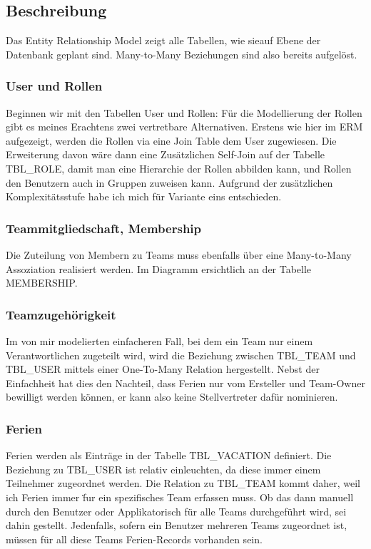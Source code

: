 \subsection{Beschreibung}
Das Entity Relationship Model zeigt alle Tabellen, wie sieauf Ebene der Datenbank geplant sind. Many-to-Many Beziehungen sind also bereits aufgel\"ost. 

\subsubsection{User und Rollen}
Beginnen wir mit den Tabellen User und Rollen: F\"ur die Modellierung der Rollen gibt es meines Erachtens zwei vertretbare Alternativen. Erstens wie hier im ERM aufgezeigt, werden die Rollen via eine Join Table dem User zugewiesen. Die Erweiterung davon w\"are dann eine Zus\"atzlichen Self-Join auf der Tabelle TBL\_ROLE, damit man eine Hierarchie der Rollen abbilden kann, und Rollen den Benutzern auch in Gruppen zuweisen kann. Aufgrund der zus\"atzlichen Komplexit\"atsstufe habe ich mich f\"ur Variante eins entschieden.

\subsubsection{Teammitgliedschaft, Membership}
Die Zuteilung von Membern zu Teams muss ebenfalls \"uber eine Many-to-Many Assoziation realisiert werden. Im Diagramm ersichtlich an der Tabelle MEMBERSHIP. 

\subsubsection{Teamzugeh\"origkeit}
Im von mir modelierten einfacheren Fall, bei dem ein Team nur einem Verantwortlichen zugeteilt wird, wird die Beziehung zwischen TBL\_TEAM und TBL\_USER mittels einer One-To-Many Relation hergestellt. Nebst der Einfachheit hat dies den Nachteil, dass Ferien nur vom Ersteller und Team-Owner bewilligt werden k\"onnen, er kann also keine Stellvertreter daf\"ur nominieren. 

\subsubsection{Ferien}
Ferien werden als Eintr\"age in der Tabelle TBL\_VACATION definiert. Die Beziehung zu TBL\_USER ist relativ einleuchten, da diese immer einem Teilnehmer zugeordnet werden. Die Relation zu TBL\_TEAM kommt daher, weil ich Ferien immer \"fur ein spezifisches Team erfassen muss. Ob das dann manuell durch den Benutzer oder Applikatorisch f\"ur alle Teams durchgef\"uhrt wird, sei dahin gestellt. Jedenfalls, sofern ein Benutzer mehreren Teams zugeordnet ist, m\"ussen f\"ur all diese Teams Ferien-Records vorhanden sein.